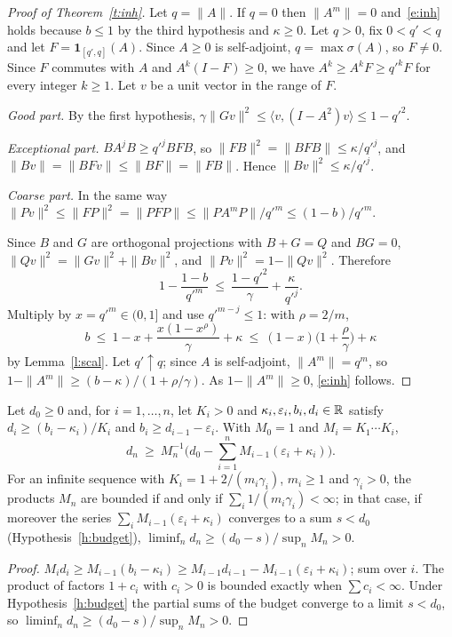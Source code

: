 \begin{proof}[Proof of Theorem~\ref{t:inh}]
Let $q=\|A\|$. If $q=0$ then $\|A^m\|=0$ and~\eqref{e:inh} holds because $b\le1$ by the third hypothesis and
$\kappa\ge0$. Let $q>0$, fix $0<q'<q$ and let $F=\mathbf 1_{[q',q]}(A)$. Since $A\ge0$ is self-adjoint, $q=\max\sigma(A)$, so $F\ne0$. Since $F$ commutes
with $A$ and $A^k(I-F)\ge0$, we have $A^k\ge A^kF\ge q'^kF$ for every integer $k\ge1$. Let $v$ be a unit
vector in the range of $F$.

\emph{Good part.} By the first hypothesis, $\gamma\|Gv\|^2\le\langle v,(I-A^2)v\rangle\le1-q'^2$.

\emph{Exceptional part.} $BA^jB\ge q'^jBFB$, so $\|FB\|^2=\|BFB\|\le\kappa/q'^j$, and
$\|Bv\|=\|BFv\|\le\|BF\|=\|FB\|$. Hence $\|Bv\|^2\le\kappa/q'^j$.

\emph{Coarse part.} In the same way $\|Pv\|^2\le\|FP\|^2=\|PFP\|\le\|PA^mP\|/q'^m\le(1-b)/q'^m$.

Since $B$ and $G$ are orthogonal projections with $B+G=Q$ and $BG=0$, $\|Qv\|^2=\|Gv\|^2+\|Bv\|^2$, and
$\|Pv\|^2=1-\|Qv\|^2$. Therefore
\[
1-\frac{1-b}{q'^m}\ \le\ \frac{1-q'^2}{\gamma}+\frac{\kappa}{q'^j} .
\]
Multiply by $x=q'^m\in(0,1]$ and use $q'^{m-j}\le1$: with $\rho=2/m$,
\[
b\ \le\ 1-x+\frac{x(1-x^{\rho})}{\gamma}+\kappa\ \le\ (1-x)\Big(1+\frac{\rho}{\gamma}\Big)+\kappa
\]
by Lemma~\ref{l:scal}. Let $q'\uparrow q$; since $A$ is self-adjoint, $\|A^m\|=q^m$, so
$1-\|A^m\|\ge(b-\kappa)/(1+\rho/\gamma)$. As $1-\|A^m\|\ge0$, \eqref{e:inh} follows.
\end{proof}

\begin{corollary}[Accumulation]\label{c:acc}
Let $d_0\ge0$ and, for $i=1,\dots,n$, let $K_i>0$ and $\kappa_i,\varepsilon_i,b_i,d_i\in\mathbb{R}$ satisfy
$d_i\ge(b_i-\kappa_i)/K_i$ and $b_i\ge d_{i-1}-\varepsilon_i$. With $M_0=1$ and $M_i=K_1\cdots K_i$,
\[
d_n\ \ge\ M_n^{-1}\Big(d_0-\sum_{i=1}^nM_{i-1}(\varepsilon_i+\kappa_i)\Big).
\]
For an infinite sequence with $K_i=1+2/(m_i\gamma_i)$, $m_i\ge1$ and $\gamma_i>0$, the products $M_n$ are
bounded if and only if $\sum_i1/(m_i\gamma_i)<\infty$; in that case, if moreover the series $\sum_iM_{i-1}(\varepsilon_i+\kappa_i)$ converges to a sum $s<d_0$
(Hypothesis~\ref{h:budget}), $\liminf_nd_n\ge(d_0-s)/\sup_nM_n>0$.
\end{corollary}
\begin{proof}
$M_id_i\ge M_{i-1}(b_i-\kappa_i)\ge M_{i-1}d_{i-1}-M_{i-1}(\varepsilon_i+\kappa_i)$; sum over $i$. The product of
factors $1+c_i$ with $c_i>0$ is bounded exactly when $\sum c_i<\infty$. Under Hypothesis~\ref{h:budget} the
partial sums of the budget converge to a limit $s<d_0$, so $\liminf_nd_n\ge(d_0-s)/\sup_nM_n>0$.
\end{proof}


